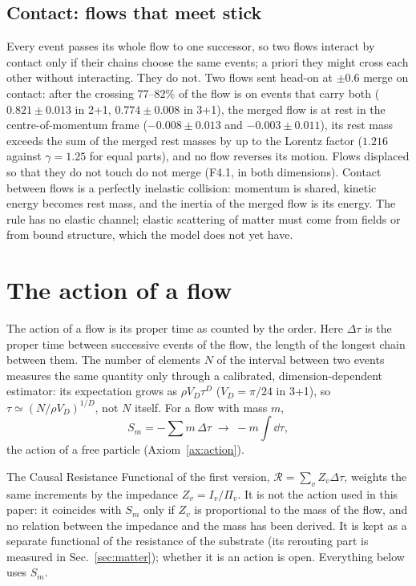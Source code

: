 \subsection{Contact: flows that meet stick}\label{sec:contact}

Every event passes its whole flow to one successor, so two flows interact by contact only if their chains choose
the same events; a priori they might cross each other without interacting. They do not. Two flows sent head-on
at $\pm0.6$ merge on contact: after the crossing $77$--$82\%$ of the flow is on events that carry both
($0.821\pm0.013$ in 2+1, $0.774\pm0.008$ in 3+1), the merged flow is at rest in the centre-of-momentum frame
($-0.008\pm0.013$ and $-0.003\pm0.011$), its rest mass exceeds the sum of the merged rest masses by up to the
Lorentz factor ($1.216$ against $\gamma=1.25$ for equal parts), and no flow reverses its motion. Flows displaced
so that they do not touch do not merge (F4.1,  in both dimensions). Contact between flows is a
perfectly inelastic collision: momentum is shared, kinetic energy becomes rest mass, and the inertia of the merged
flow is its energy. The rule has no elastic channel; elastic scattering of matter must come from fields or from
bound structure, which the model does not yet have.

\section{The action of a flow}\label{sec:action}

The action of a flow is its proper time as counted by the order. Here $\Delta\tau$ is the proper time between
successive events of the flow, the length of the longest chain between them. The number of elements $N$ of the
interval between two events measures the same quantity only through a calibrated, dimension-dependent estimator:
its expectation grows as $\rho V_D\tau^D$ ($V_D=\pi/24$ in 3+1), so $\tau\simeq(N/\rho V_D)^{1/D}$, not $N$
itself. For a flow with mass $m$,
\begin{equation}\label{eq:A6}
  S_m=-\sum m\,\Delta\tau \;\longrightarrow\; -m\!\int\!\dd\tau ,
\end{equation}
the action of a free particle (Axiom~\ref{ax:action}).

The Causal Resistance Functional of the first version, $\mathcal R=\sum_v Z_v\Delta\tau$, weights the same
increments by the impedance $Z_v=I_v/\Pi_v$. It is not the action used in this paper: it coincides with $S_m$ only
if $Z_v$ is proportional to the mass of the flow, and no relation between the impedance and the mass has been
derived. It is kept as a separate functional of the resistance of the substrate (its rerouting part is measured in
Sec.~\ref{sec:matter}); whether it is an action is open. Everything below uses $S_m$.

